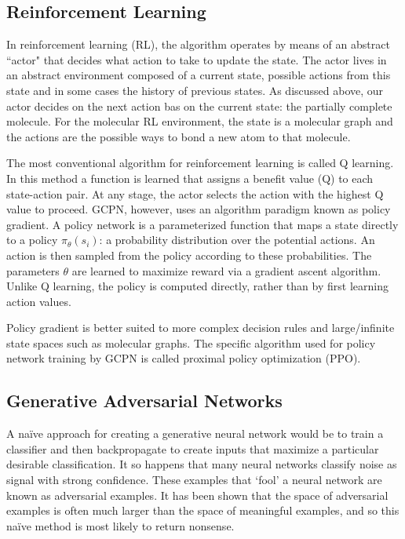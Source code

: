 \documentclass{article}
\begin{document}
\subsection{Reinforcement Learning}
In reinforcement learning (RL), the algorithm operates by means of an abstract ``actor" that decides what action to take to update the state. The actor lives in an abstract environment composed of a current state, possible actions from this state and in some cases the history of previous states. As discussed above, our actor decides on the next action bas
\subsect on the current state: the partially complete molecule. For the molecular RL environment, the state is a molecular graph and the actions are the possible ways to bond a new atom to that molecule.

The most conventional algorithm for reinforcement learning is called Q learning. In this method a function is learned that assigns a benefit value (Q) to each state-action pair. At any stage, the actor selects the action with the highest Q value to proceed. GCPN, however, uses an algorithm paradigm known as policy gradient. A policy network is a parameterized function that maps a state directly to a policy $\pi_\theta(s_i)$: a probability distribution over the potential actions. An action is then sampled from the policy according to these probabilities. The parameters $\theta$ are learned to maximize reward via a gradient ascent algorithm. Unlike Q learning, the policy is computed directly, rather than by first learning action values.

Policy gradient is better suited to more complex decision rules and large/infinite state spaces such as molecular graphs. The specific algorithm used for policy network training by GCPN is called proximal policy optimization (PPO).

\subsection{Generative Adversarial Networks}
A na\"ive approach for creating a generative neural network would be to train a classifier and then backpropagate to create inputs that maximize a particular desirable classification. It so happens that many neural networks classify noise as signal with strong confidence. These examples that `fool' a neural network are known as adversarial examples. It has been shown that the space of adversarial examples is often much larger than the space of meaningful examples, and so this na\"ive method is most likely to return nonsense.
\end{document}
